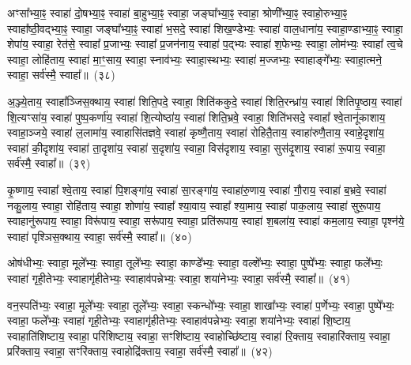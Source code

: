 अꣳसा᳚भ्या॒ꣴ॒ स्वाहा॑ दो॒षभ्या॒ꣴ॒ स्वाहा॑ बा॒हुभ्या॒ꣴ॒ स्वाहा॒ जङ्घा᳚भ्या॒ꣴ॒ स्वाहा॒ श्रोणी᳚भ्या॒ꣴ॒ स्वाहो॒रुभ्या॒ꣴ॒ स्वाहा᳚ष्ठी॒वद्भ्या॒ꣴ॒ स्वाहा॒ जङ्घा᳚भ्या॒ꣴ॒ स्वाहा॑ भ॒सदे॒ स्वाहा॑ शिख॒ण्डेभ्यः॒ स्वाहा॑ वाल॒धाना॑य॒ स्वाहा॒ण्डाभ्या॒ꣴ॒ स्वाहा॒ शेपा॑य॒ स्वाहा॒ रेत॑से॒ स्वाहा᳚ प्र॒जाभ्यः॒ स्वाहा᳚ प्र॒जन॑नाय॒ स्वाहा॑ प॒द्भ्यः स्वाहा॑ श॒फेभ्यः॒ स्वाहा॒ लोम॑भ्यः॒ स्वाहा᳚ त्व॒चे स्वाहा॒ लोहि॑ताय॒ स्वाहा॑ मा॒ꣳ॒साय॒ स्वाहा॒ स्नाव॑भ्यः॒ स्वाहा॒स्थभ्यः॒ स्वाहा॑ म॒ज्जभ्यः॒ स्वाहाङ्गे᳚भ्यः॒ स्वाहा॒त्मने॒ स्वाहा॒ सर्व॑स्मै॒ स्वाहा᳚॥~(३८)

{\anuvakamend[{पा॒र्श्वाभ्या॒ꣴ॒ स्वाहा॑ म॒ज्जभ्यः॒ स्वाहा॒ षट्च॑}]}%

अ॒ञ्ज्ये॒ताय॒ स्वाहा᳚ञ्जिस॒क्थाय॒ स्वाहा॑ शिति॒पदे॒ स्वाहा॒ शिति॑ककुदे॒ स्वाहा॑ शिति॒रन्ध्रा॑य॒ स्वाहा॑ शितिपृ॒ष्ठाय॒ स्वाहा॑ शि॒त्यꣳसा॑य॒ स्वाहा॑ पुष्प॒कर्णा॑य॒ स्वाहा॑ शि॒त्योष्ठा॑य॒ स्वाहा॑ शिति॒भ्रवे॒ स्वाहा॒ शिति॑भसदे॒ स्वाहा᳚ श्वे॒तानू॑काशाय॒ स्वाहा॒ञ्जये॒ स्वाहा॑ ल॒लामा॑य॒ स्वाहासि॑तज्ञवे॒ स्वाहा॑ कृष्णै॒ताय॒ स्वाहा॑ रोहितै॒ताय॒ स्वाहा॑रुणै॒ताय॒ स्वाहे॒दृशा॑य॒ स्वाहा॑ की॒दृशा॑य॒ स्वाहा॑ ता॒दृशा॑य॒ स्वाहा॑ स॒दृशा॑य॒ स्वाहा॒ विस॑दृशाय॒ स्वाहा॒ सुस॑दृ॒शाय॒ स्वाहा॑ रू॒पाय॒ स्वाहा॒ सर्व॑स्मै॒ स्वाहा᳚॥~(३९)

{\anuvakamend[{रू॒पाय॒ स्वाहा॒ द्वे च॑}]}%

कृ॒ष्णाय॒ स्वाहा᳚ श्वे॒ताय॒ स्वाहा॑ पि॒शङ्गा॑य॒ स्वाहा॑ सा॒रङ्गा॑य॒ स्वाहा॑रु॒णाय॒ स्वाहा॑ गौ॒राय॒ स्वाहा॑ ब॒भ्रवे॒ स्वाहा॑ नकु॒लाय॒ स्वाहा॒ रोहि॑ताय॒ स्वाहा॒ शोणा॑य॒ स्वाहा᳚ श्या॒वाय॒ स्वाहा᳚ श्या॒माय॒ स्वाहा॑ पाक॒लाय॒ स्वाहा॑ सुरू॒पाय॒ स्वाहानु॑रूपाय॒ स्वाहा॒ विरू॑पाय॒ स्वाहा॒ सरू॑पाय॒ स्वाहा॒ प्रति॑रूपाय॒ स्वाहा॑ श॒बला॑य॒ स्वाहा॑ कम॒लाय॒ स्वाहा॒ पृश्न॑ये॒ स्वाहा॑ पृश्ञिस॒क्थाय॒ स्वाहा॒ सर्व॑स्मै॒ स्वाहा᳚॥~(४०)

{\anuvakamend[{कृ॒ष्णाय॒ षट्च॑त्वारिꣳशत्}]}%

ओष॑धीभ्यः॒ स्वाहा॒ मूले᳚भ्यः॒ स्वाहा॒ तूले᳚भ्यः॒ स्वाहा॒ काण्डे᳚भ्यः॒ स्वाहा॒ वल्\mbox{}शे᳚भ्यः॒ स्वाहा॒ पुष्पे᳚भ्यः॒ स्वाहा॒ फले᳚भ्यः॒ स्वाहा॑ गृही॒तेभ्यः॒ स्वाहागृ॑हीतेभ्यः॒ स्वाहाव॑पन्नेभ्यः॒ स्वाहा॒ शया॑नेभ्यः॒ स्वाहा॒ सर्व॑स्मै॒ स्वाहा᳚॥~(४१)

{\anuvakamend[{ओष॑धीभ्य॒श्चतु॑र्विꣳशतिः}]}%

वन॒स्पति॑भ्यः॒ स्वाहा॒ मूले᳚भ्यः॒ स्वाहा॒ तूले᳚भ्यः॒ स्वाहा॒ स्कन्धो᳚भ्यः॒ स्वाहा॒ शाखा᳚भ्यः॒ स्वाहा॑ प॒र्णेभ्यः॒ स्वाहा॒ पुष्पे᳚भ्यः॒ स्वाहा॒ फले᳚भ्यः॒ स्वाहा॑ गृही॒तेभ्यः॒ स्वाहागृ॑हीतेभ्यः॒ स्वाहाव॑पन्नेभ्यः॒ स्वाहा॒ शया॑नेभ्यः॒ स्वाहा॑ शि॒ष्टाय॒ स्वाहाति॑शिष्टाय॒ स्वाहा॒ परि॑शिष्टाय॒ स्वाहा॒ सꣳशि॑ष्टाय॒ स्वाहोच्छि॑ष्टाय॒ स्वाहा॑ रि॒क्ताय॒ स्वाहारि॑क्ताय॒ स्वाहा॒ प्ररि॑क्ताय॒ स्वाहा॒ सꣳरि॑क्ताय॒ स्वाहोद्रि॑क्ताय॒ स्वाहा॒ सर्व॑स्मै॒ स्वाहा᳚॥~(४२)

